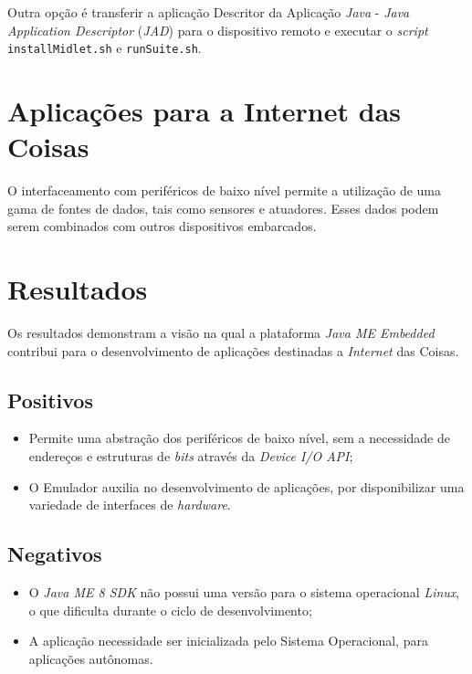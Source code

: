 Outra opção é transferir a aplicação Descritor da Aplicação \textit{Java} - 
\textit{Java Application Descriptor} (\textit{JAD}) para o dispositivo remoto e 
executar o \textit{script} \verb|installMidlet.sh| e \verb|runSuite.sh|.

\section{Aplicações para a Internet das Coisas}

O interfaceamento com periféricos de baixo nível permite a utilização de uma 
gama de fontes de dados, tais como sensores e atuadores. Esses dados podem 
serem combinados com outros dispositivos embarcados.

\section{Resultados}

Os resultados demonstram a visão na qual a plataforma \textit{Java ME Embedded} 
contribui para o desenvolvimento de aplicações destinadas a \textit{Internet} 
das Coisas.

\subsection{Positivos}

\begin{itemize}
    
    \item Permite uma abstração dos periféricos de baixo nível, sem a 
    necessidade de endereços e estruturas de \textit{bits} através da 
    \textit{Device I/O API};
    
    \item O Emulador auxilia no desenvolvimento de aplicações, por 
    disponibilizar uma variedade de interfaces de \textit{hardware}.
    
\end{itemize}

\subsection{Negativos}

\begin{itemize}
    
    \item O \textit{Java ME 8 SDK} não possui uma versão para o sistema 
    operacional \textit{Linux}, o que dificulta durante o ciclo de 
    desenvolvimento;
    
    \item A aplicação necessidade ser inicializada pelo Sistema Operacional, 
    para aplicações autônomas.
    
\end{itemize}

